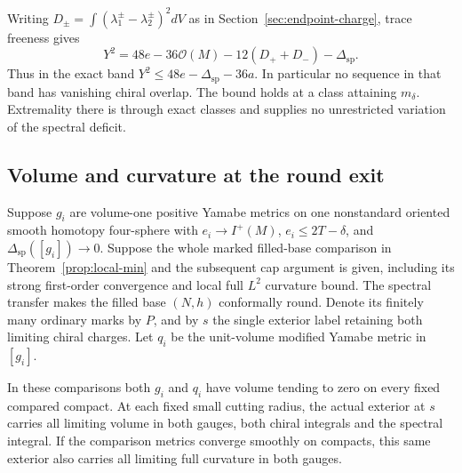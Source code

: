 Writing \(D_\pm=\int(\lambda_1^\pm-\lambda_2^\pm)^2dV\) as in
Section~\ref{sec:endpoint-charge}, trace freeness gives
\[
 Y^2=48e-36\mathcal O(M)-12(D_++D_-)-\Delta_{\mathrm{sp}} .
\]
Thus in the exact band \(Y^2\le48e-\Delta_{\mathrm{sp}}-36a\).
In particular no sequence in that band has vanishing chiral
overlap. The bound holds at a class attaining \(m_\delta\).
Extremality there is through exact classes and supplies no
unrestricted variation of the spectral deficit.

\subsection{Volume and curvature at the round exit}
\label{sec:round-joint-exit}

Suppose \(g_i\) are volume-one positive Yamabe metrics on one
nonstandard oriented smooth homotopy four-sphere with
\(e_i\to I^+(M)\), \(e_i\le2T-\delta\), and
\(\Delta_{\mathrm{sp}}([g_i])\to0\). Suppose the whole
marked filled-base comparison in
Theorem~\ref{prop:local-min} and the subsequent cap argument
is given, including its strong first-order convergence and local
full \(L^2\) curvature bound. The spectral transfer makes the
filled base \((N,h)\) conformally round. Denote its finitely many
ordinary marks by \(P\), and by \(s\) the single exterior label
retaining both limiting chiral charges. Let \(q_i\) be the
unit-volume modified Yamabe metric in \([g_i]\).

\begin{proposition}
\label{prop:round-joint-exit}
In these comparisons both \(g_i\) and \(q_i\) have volume tending
to zero on every fixed compared compact. At each fixed small
cutting radius, the actual exterior at \(s\) carries all limiting
volume in both gauges, both chiral integrals and the spectral
integral. If the comparison metrics converge smoothly on
compacts, this same exterior also carries all limiting full
curvature in both gauges.
\end{proposition}

